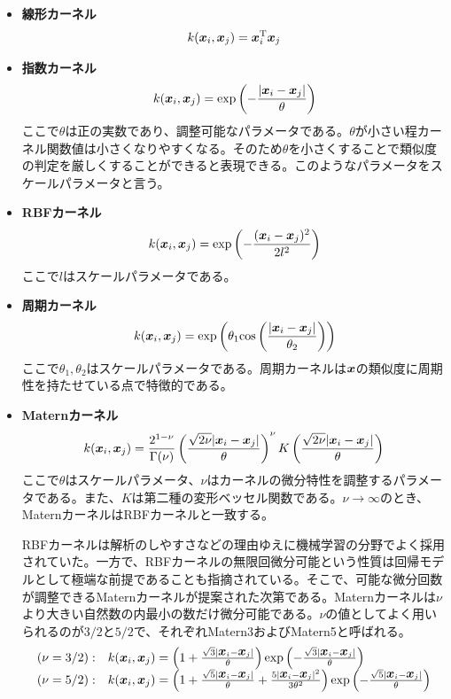 \documentclass[dvipdfmx, 9pt, a4paper]{jsarticle}
\numberwithin{equation}{section}
\newcommand{\bm}[1]{{\mbox{\boldmath $#1$}}}
\begin{document}
\begin{itemize}
\item {\bf 線形カーネル}
\begin{equation}
k(\bm x_i, \bm x_j) = \bm x_i^{\rm T}\bm x_j \notag
\end{equation}
\item {\bf 指数カーネル}
\begin{equation}
k(\bm x_i, \bm x_j) = {\rm exp}\left( -\frac{|\bm x_i-\bm x_j|}{\theta} \right) \notag
\end{equation}
ここで$\theta$は正の実数であり、調整可能なパラメータである。$\theta$が小さい程カーネル関数値は小さくなりやすくなる。そのため$\theta$を小さくすることで類似度の判定を厳しくすることができると表現できる。このようなパラメータをスケールパラメータと言う。
\item {\bf RBFカーネル}
\begin{equation}
k(\bm x_i, \bm x_j) = {\rm exp}\left( -\frac{(\bm x_i-\bm x_j)^2}{2l^2} \right) \notag
\end{equation}
ここで$l$はスケールパラメータである。
\item {\bf 周期カーネル}
\begin{equation}
k(\bm x_i, \bm x_j) = {\rm exp}\left(\theta_1{\rm cos}\left( \frac{|\bm x_i-\bm x_j|}{\theta_2} \right)\right) \notag
\end{equation}
ここで$\theta_1, \theta_2$はスケールパラメータである。周期カーネルは$\bm x$の類似度に周期性を持たせている点で特徴的である。
\item {\bf Maternカーネル}
\begin{equation}
k(\bm x_i, \bm x_j)=\frac{2^{1-\nu}}{\Gamma(\nu)}\left( \frac{\sqrt{2\nu}|\bm x_i-\bm x_j|}{\theta} \right)^\nu K\left(\frac{\sqrt{2\nu}|\bm x_i-\bm x_j|}{\theta}\right) \notag
\end{equation}
ここで$\theta$はスケールパラメータ、$\nu$はカーネルの微分特性を調整するパラメータである。また、$K$は第二種の変形ベッセル関数である。$\nu \to \infty$のとき、MaternカーネルはRBFカーネルと一致する。\par
RBFカーネルは解析のしやすさなどの理由ゆえに機械学習の分野でよく採用されていた。一方で、RBFカーネルの無限回微分可能という性質は回帰モデルとして極端な前提であることも指摘されている。そこで、可能な微分回数が調整できるMaternカーネルが提案された次第である。Maternカーネルは$\nu$より大きい自然数の内最小の数だけ微分可能である。$\nu$の値としてよく用いられるのが$3/2$と$5/2$で、それぞれMatern3およびMatern5と呼ばれる。
\begin{equation}
\begin{array}{ll}
(\nu=3/2):&k(\bm x_i, \bm x_j)=\left(1+\frac{\sqrt{3}|\bm x_i-\bm x_j|}{\theta}\right){\rm exp}\left(-\frac{\sqrt{3}|\bm x_i-\bm x_j|}{\theta}\right) \\
(\nu=5/2):&k(\bm x_i, \bm x_j)=\left(1+\frac{\sqrt{5}|\bm x_i-\bm x_j|}{\theta}+\frac{5|\bm x_i-\bm x_j|^2}{3\theta^2}\right){\rm exp}\left(-\frac{\sqrt{5}|\bm x_i-\bm x_j|}{\theta}\right)
\end{array} \notag
\end{equation}
\end{itemize}
\end{document}
